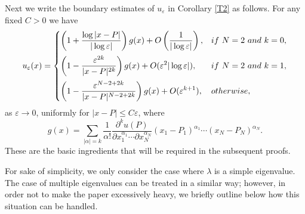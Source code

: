 \documentclass[11pt,reqno]{article}
\numberwithin{equation}{section}
\newcommand\e\varepsilon
\begin{document}
Next we write the boundary estimates of $u_\e$ in Corollary \ref{T2} as follows. For any fixed $C>0$ we have 
\begin{equation}\label{eq2204-02}
    u_\e(x)  =\begin{cases}
              \displaystyle  \left(1+\frac{\log |x-P|}{|\log\e|}\right)g(x)
              +O\left(\frac{1}{|\log\e|}\right), &if \ N=2  \ and\ k=0,\vspace{2mm}\\
			\displaystyle	  \left(1-\frac{\e^{2k}}{|x-P|^{2k}}\right)g(x)+O(\e^{2}|\log\e|),& if  \ N=2  \ and\ k=1,\vspace{2mm}\\
            \displaystyle        \left(1-\frac{\e^{N-2+2k}}{|x-P|^{N-2+2k}}
				\right)g(x)+O(\e^{k+1}), &otherwise,
                \end{cases}
\end{equation}
as $\e\to 0$, uniformly for $|x-P|\leq C\e$,
where
     \begin{equation}\label{forg}
        g(x)= \sum_{|\alpha|=k}\frac1{\alpha!}
					\frac{\partial^ku(P)}{\partial x_1^{\alpha_1}\cdots\partial x_N^{\alpha_N}}(x_1-P_1)^{\alpha_1}\cdots(x_N-P_N)^{\alpha_N}.
     \end{equation}
These are the basic ingredients that will be required in the subsequent proofs.

  For sake of simplicity, we only consider the case where $\lambda$ is a simple eigenvalue. The case of multiple eigenvalues can be treated in a similar way; however, in order not to make the paper excessively heavy, we briefly outline below how this situation can be handled.
\end{document}
